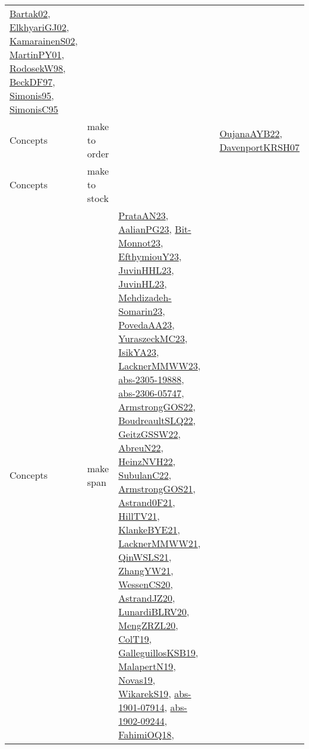 {\begin{longtable}{llp{6cm}p{6cm}p{6cm}}
\href{papers/Bartak02.pdf}{Bartak02}\cite{Bartak02}, \href{papers/ElkhyariGJ02.pdf}{ElkhyariGJ02}\cite{ElkhyariGJ02}, \href{papers/KamarainenS02.pdf}{KamarainenS02}\cite{KamarainenS02}, \href{articles/MartinPY01.pdf}{MartinPY01}\cite{MartinPY01}, \href{papers/RodosekW98.pdf}{RodosekW98}\cite{RodosekW98}, \href{papers/BeckDF97.pdf}{BeckDF97}\cite{BeckDF97}, \href{papers/Simonis95.pdf}{Simonis95}\cite{Simonis95}, \href{papers/SimonisC95.pdf}{SimonisC95}\cite{SimonisC95}\\
Concepts & make to order &  &  & \href{papers/OujanaAYB22.pdf}{OujanaAYB22}\cite{OujanaAYB22}, \href{papers/DavenportKRSH07.pdf}{DavenportKRSH07}\cite{DavenportKRSH07}\\
Concepts & make to stock &  &  & \\
Concepts & make span & \href{articles/PrataAN23.pdf}{PrataAN23}\cite{PrataAN23}, \href{papers/AalianPG23.pdf}{AalianPG23}\cite{AalianPG23}, \href{papers/Bit-Monnot23.pdf}{Bit-Monnot23}\cite{Bit-Monnot23}, \href{papers/EfthymiouY23.pdf}{EfthymiouY23}\cite{EfthymiouY23}, \href{papers/JuvinHHL23.pdf}{JuvinHHL23}\cite{JuvinHHL23}, \href{papers/JuvinHL23.pdf}{JuvinHL23}\cite{JuvinHL23}, \href{papers/Mehdizadeh-Somarin23.pdf}{Mehdizadeh-Somarin23}\cite{Mehdizadeh-Somarin23}, \href{papers/PovedaAA23.pdf}{PovedaAA23}\cite{PovedaAA23}, \href{papers/YuraszeckMC23.pdf}{YuraszeckMC23}\cite{YuraszeckMC23}, \href{articles/IsikYA23.pdf}{IsikYA23}\cite{IsikYA23}, \href{articles/LacknerMMWW23.pdf}{LacknerMMWW23}\cite{LacknerMMWW23}, \href{articles/abs-2305-19888.pdf}{abs-2305-19888}\cite{abs-2305-19888}, \href{articles/abs-2306-05747.pdf}{abs-2306-05747}\cite{abs-2306-05747}, \href{papers/ArmstrongGOS22.pdf}{ArmstrongGOS22}\cite{ArmstrongGOS22}, \href{papers/BoudreaultSLQ22.pdf}{BoudreaultSLQ22}\cite{BoudreaultSLQ22}, \href{papers/GeitzGSSW22.pdf}{GeitzGSSW22}\cite{GeitzGSSW22}, \href{articles/AbreuN22.pdf}{AbreuN22}\cite{AbreuN22}, \href{articles/HeinzNVH22.pdf}{HeinzNVH22}\cite{HeinzNVH22}, \href{articles/SubulanC22.pdf}{SubulanC22}\cite{SubulanC22}, \href{papers/ArmstrongGOS21.pdf}{ArmstrongGOS21}\cite{ArmstrongGOS21}, \href{papers/Astrand0F21.pdf}{Astrand0F21}\cite{Astrand0F21}, \href{papers/HillTV21.pdf}{HillTV21}\cite{HillTV21}, \href{papers/KlankeBYE21.pdf}{KlankeBYE21}\cite{KlankeBYE21}, \href{papers/LacknerMMWW21.pdf}{LacknerMMWW21}\cite{LacknerMMWW21}, \href{articles/QinWSLS21.pdf}{QinWSLS21}\cite{QinWSLS21}, \href{articles/ZhangYW21.pdf}{ZhangYW21}\cite{ZhangYW21}, \href{papers/WessenCS20.pdf}{WessenCS20}\cite{WessenCS20}, \href{articles/AstrandJZ20.pdf}{AstrandJZ20}\cite{AstrandJZ20}, \href{articles/LunardiBLRV20.pdf}{LunardiBLRV20}\cite{LunardiBLRV20}, \href{articles/MengZRZL20.pdf}{MengZRZL20}\cite{MengZRZL20}, \href{papers/ColT19.pdf}{ColT19}\cite{ColT19}, \href{papers/GalleguillosKSB19.pdf}{GalleguillosKSB19}\cite{GalleguillosKSB19}, \href{papers/MalapertN19.pdf}{MalapertN19}\cite{MalapertN19}, \href{articles/Novas19.pdf}{Novas19}\cite{Novas19}, \href{articles/WikarekS19.pdf}{WikarekS19}\cite{WikarekS19}, \href{articles/abs-1901-07914.pdf}{abs-1901-07914}\cite{abs-1901-07914}, \href{articles/abs-1902-09244.pdf}{abs-1902-09244}\cite{abs-1902-09244}, \href{articles/FahimiOQ18.pdf}{FahimiOQ18}\cite{FahimiOQ18}, 
\end{longtable}}
